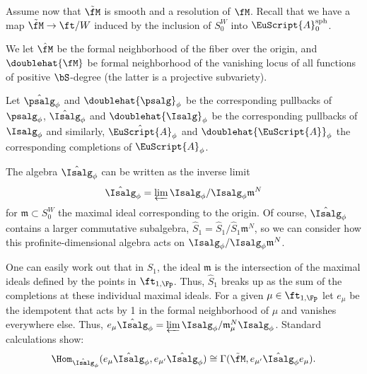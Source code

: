 Assume now that $\tilde{\fM}$ is smooth and a resolution of $\fM$. Recall that we have a map $\tilde{\fM}\to \ft/W$ induced by the inclusion of $S_0^W$ into
$\EuScript{A}_0^{\operatorname{sph}}$.
\begin{definition}
  We let $\hat{\fM}$ be the formal neighborhood of the fiber over the origin, and $\doublehat{\fM}$ be formal neighborhood of the vanishing locus of all functions of positive $\bS$-degree (the latter is a projective subvariety).

 Let $\hat{\psalg}_\phi$ and $\doublehat{\psalg}_\phi$ be the corresponding pullbacks of $ \psalg_\phi$, $\hat{\Isalg}_\phi$ and $\doublehat{\Isalg}_\phi$ be the corresponding pullbacks of $ \Isalg_\phi$ and similarly, $\hat{\EuScript{A}}_\phi$ and $\doublehat{\EuScript{A}}_\phi$ the corresponding completions of $ \EuScript{A}_{\phi}$.
\end{definition}




The algebra $\hat{\Isalg}_\phi$ can be written as the inverse limit
\[\hat{\Isalg}_\phi=\varprojlim {\Isalg}_\phi/{\Isalg}_\phi\mathfrak{m}^N\] for
$\mathfrak{m}\subset S_0^W$ the maximal ideal corresponding to the
origin.  Of course, $\hat{\Isalg}_\phi$ contains a larger commutative
subalgebra, $\hat{S}_1=\hat{S}_1/\hat{S}_1\mathfrak{m}^N$, so we can consider how this profinite-dimensional algebra acts on
${\Isalg}_\phi/{\Isalg}_\phi\mathfrak{m}^N$.

One can easily work out that in 
$S_1$, the ideal $\mathfrak{m}$ is the intersection of the maximal ideals defined by the points in $\ft_{1,\Fp}$.  Thus, $\hat{S}_1$ breaks up as the sum of the completions at these individual maximal ideals.  For a given $\mu\in \ft_{1,\Fp}$ let $e_{\mu}$ be the idempotent that acts by 1 in the formal neighborhood of $\mu$ and vanishes everywhere else.  Thus, $e_{\mu}\hat{\Isalg}_\phi =\varprojlim \Isalg_\phi/ \mathfrak{m}_{\mu}^N \Isalg_\phi$.  Standard calculations show:
\begin{equation}\label{eq:summand-hom}
  \Hom_{\hat{\Isalg}_\phi}(e_{\mu}\hat{\Isalg}_\phi, e_{\mu'}\hat{\Isalg}_\phi)\cong \Gamma(\tilde{\fM}, e_{\mu'}\hat{\Isalg}_\phi e_{\mu}).  
\end{equation}

